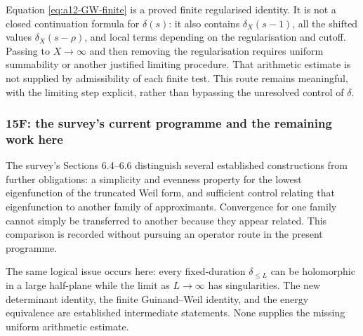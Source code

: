 \documentclass[11pt]{amsart}
\numberwithin{equation}{section}
\theoremstyle{plain}
\theoremstyle{definition}
\theoremstyle{remark}
\begin{document}
Equation \eqref{eq:a12-GW-finite} is a proved finite regularised identity.
It is not a closed continuation formula for $\delta(s)$: it also
contains $\delta_X(s-1)$, all the shifted values $\delta_X(s-\rho)$,
and local terms depending on the regularisation and cutoff.
Passing to $X\to\infty$ and then removing the regularisation requires
uniform summability or another justified limiting procedure.
That arithmetic estimate is not supplied by admissibility of each
finite test. This route remains meaningful, with the limiting step
explicit, rather than bypassing the unresolved control of $\delta$.

\subsubsection{15F: the survey's current programme and the remaining work here}
\label{subsubsec:a12-survey-status}
The survey's Sections 6.4--6.6 distinguish several established
constructions from further obligations: a simplicity and evenness
property for the lowest eigenfunction of the truncated Weil form, and
sufficient control relating that eigenfunction to another family of
approximants. Convergence for one family cannot simply be transferred
to another because they appear related. This comparison is recorded
without pursuing an operator route in the present programme.

The same logical issue occurs here: every fixed-duration
$\delta_{\le L}$ can be holomorphic in a large half-plane while the
limit as $L\to\infty$ has singularities. The new determinant identity,
the finite Guinand--Weil identity, and the energy equivalence are
established intermediate statements. None supplies the missing
uniform arithmetic estimate.

\begin{center}
\end{center}
\end{document}
